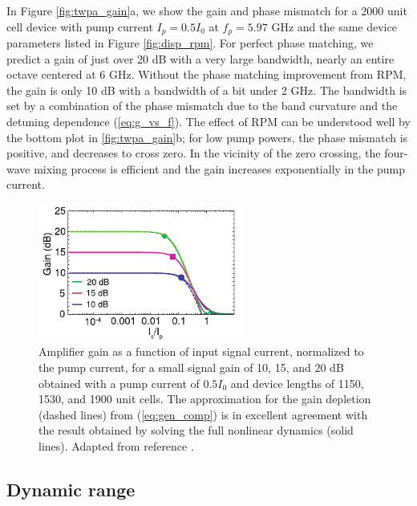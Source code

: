 In Figure \ref{fig:twpa_gain}a, we show the gain and phase mismatch for a 2000 unit cell device with pump current $I_p = 0.5 I_0$ at $f_p = 5.97$ GHz and the same device parameters listed in Figure \ref{fig:disp_rpm}.  For perfect phase matching, we predict a gain of just over 20 dB with a very large bandwidth, nearly an entire octave centered at 6 GHz.  Without the phase matching improvement from RPM, the gain is only 10 dB with a bandwidth of a bit under 2 GHz.  The bandwidth is set by a combination of the phase mismatch due to the band curvature and the detuning dependence (\ref{eq:g_vs_f}).  The effect of RPM can be understood well by the bottom plot in \ref{fig:twpa_gain}b; for low pump powers, the phase mismatch is positive, and decreases to cross zero.  In the vicinity of the zero crossing, the four-wave mixing process is efficient and the gain increases exponentially in the pump current.

\begin{figure}
\begin{center}
\includegraphics[width = 2.63in]{twpa_theory/twpa_comp}
\end{center}
\caption[JTWPA gain compression]{Amplifier gain as a function of input signal current, normalized to the pump current, for a small signal gain of 10, 15, and 20 dB obtained with a pump current of $0.5 I_0$ and device lengths of 1150, 1530, and 1900 unit cells. The approximation for the gain depletion (dashed lines) from (\ref{eq:gen_comp}) is in excellent agreement with the result obtained by solving the full nonlinear dynamics (solid lines).   Adapted from reference \cite{OBrien2014}.}
\label{fig:twpa_comp}
\end{figure}

\subsection{Dynamic range}

